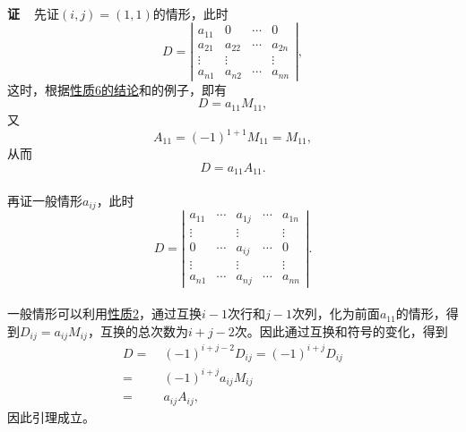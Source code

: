 \paragraph{}
\textbf{证~~}先证$(i,j)=(1,1)$的情形，此时
\begin{equation*}
  D = \left|\begin{array}{cccc}
    a_{11} & 0 & \cdots & 0 \\
    a_{21} & a_{22} & \cdots & a_{2n} \\
    \vdots & \vdots &  & \vdots \\
    a_{n1} & a_{n2} & \cdots  & a_{nn}
  \end{array} \right|,
\end{equation*}
这时，根据\hyperlink{行列式性质6的结论}{\color{blue}性质6的结论}和的例子，即有
\begin{equation*}
  D = a_{11}M_{11},
\end{equation*}
又
\begin{equation*}
  A_{11} = (-1)^{1+1}M_{11} = M_{11},
\end{equation*}
从而
\begin{equation*}
  D = a_{11}A_{11}.
\end{equation*}

\paragraph{}
再证一般情形$a_{ij}$，此时
\begin{equation*}
  D = \left|\begin{array}{ccccc}
    a_{11} & \cdots & a_{1j} & \cdots & a_{1n} \\
    \vdots &  & \vdots &  & \vdots \\
    0 & \cdots & a_{ij} & \cdots & 0 \\
    \vdots &  & \vdots &  & \vdots \\
    a_{n1} & \cdots & a_{nj} & \cdots & a_{nn}
  \end{array} \right|.
\end{equation*}

\paragraph{}
一般情形可以利用\hyperlink{行列式性质2}{\color{blue}性质2}，通过互换$i-1$次行和$j-1$次列，化为前面$a_{11}$的情形，得到$D_{ij}=a_{ij}M_{ij}$，互换的总次数为$i+j-2$次。因此通过互换和符号的变化，得到
\begin{align*}
  D =&\; (-1)^{i+j-2}D_{ij} = (-1)^{i+j}D_{ij} \\
  =&\; (-1)^{i+j}a_{ij}M_{ij} \\
  =&\; a_{ij}A_{ij},
\end{align*}
因此引理成立。

